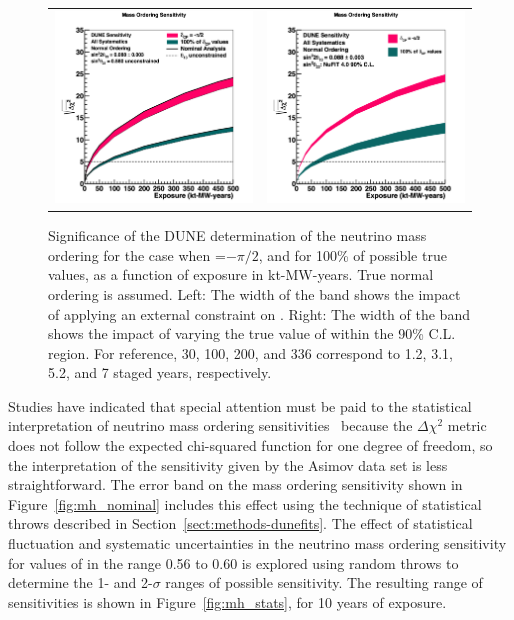 \begin{figure}[h!]
    \centering
    \begin{tabular}{cc}
    \includegraphics[width=0.475\linewidth]{graphics/mh_exp_varyconstr_nh_2019_v4.png} &
	\includegraphics[width=0.475\linewidth]{graphics/mh_exp_varyth23_nh_2019_v4.png} 
	\end{tabular}
	\caption[Significance of the DUNE neutrino mass ordering determination as a function of exposure]{Significance of the DUNE determination of the neutrino mass ordering for the case when \deltacp=$-\pi/2$, and for 100\% of possible true \deltacp values, as a function of exposure in kt-MW-years. True normal ordering is assumed. Left: The width of the band shows the impact of applying an external constraint on . Right: The width of the band shows the impact of varying the true value of  within the  90\% C.L. region.
For reference, 30, 100, 200, and \SI{336}{\ktMWyr} correspond to 1.2, 3.1, 5.2, and 7  staged years, respectively.
}
    \label{fig:mh_exposure}
\end{figure}

Studies have indicated that special attention must be paid to the statistical interpretation of neutrino mass ordering sensitivities~\cite{Qian:2012zn,Blennow:2013oma} because the $\Delta\chi^2$ metric does not follow the expected chi-squared function for one degree of freedom, so the interpretation of the sensitivity given by the Asimov data set is less straightforward. The error band on the mass ordering sensitivity shown in Figure~\ref{fig:mh_nominal} includes this effect using the technique of statistical throws described in Section~\ref{sect:methods-dunefits}. The effect of statistical fluctuation and systematic uncertainties in the neutrino mass ordering sensitivity for values of  in the range 0.56 to 0.60 is explored using random throws to determine the 1- and 2-$\sigma$ ranges of possible sensitivity. The resulting range of sensitivities is shown in Figure~\ref{fig:mh_stats}, for 10 years of exposure.

